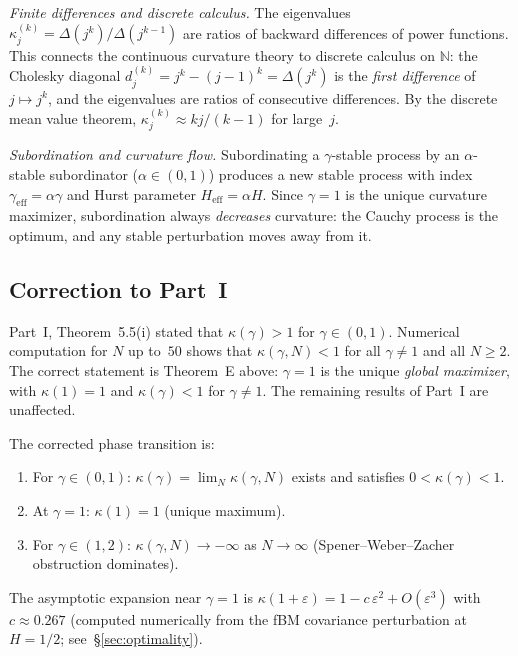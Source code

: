 \documentclass[11pt,a4paper]{article}
\theoremstyle{plain}
\theoremstyle{definition}
\theoremstyle{remark}
\newcommand{\N}{\mathbb{N}}
\begin{document}
\emph{Finite differences and discrete calculus.}
The eigenvalues $\kappa_j^{(k)} = \Delta(j^k)/\Delta(j^{k-1})$
are ratios of backward differences of power functions.
This connects the continuous curvature theory to
discrete calculus on $\N$: the Cholesky diagonal
$d_j^{(k)} = j^k - (j{-}1)^k = \Delta(j^k)$ is the
\emph{first difference} of $j \mapsto j^k$,
and the eigenvalues are ratios of consecutive differences.
By the discrete mean value theorem,
$\kappa_j^{(k)} \approx kj/(k{-}1)$ for large~$j$.

\emph{Subordination and curvature flow.}
Subordinating a $\gamma$-stable process by an $\alpha$-stable
subordinator ($\alpha \in (0,1)$) produces a new stable process
with index $\gamma_{\mathrm{eff}} = \alpha\gamma$ and Hurst
parameter $H_{\mathrm{eff}} = \alpha H$.
Since $\gamma = 1$ is the unique curvature maximizer,
subordination always \emph{decreases} curvature:
the Cauchy process is the optimum, and any stable
perturbation moves away from it.


\subsection{Correction to Part~I}

Part~I, Theorem~5.5(i) stated that
$\kappa(\gamma) > 1$ for $\gamma \in (0,1)$.
Numerical computation for $N$ up to~$50$ shows that
$\kappa(\gamma,N) < 1$ for all $\gamma \neq 1$ and all
$N \geq 2$. The correct statement is Theorem~E above:
$\gamma = 1$ is the unique \emph{global maximizer}, with
$\kappa(1) = 1$ and $\kappa(\gamma) < 1$ for $\gamma \neq 1$.
The remaining results of Part~I are unaffected.

The corrected phase transition is:
\begin{enumerate}[label=(\roman*)]
\item For $\gamma \in (0,1)$:
  $\kappa(\gamma) = \lim_N \kappa(\gamma,N)$ exists and
  satisfies $0 < \kappa(\gamma) < 1$.
\item At $\gamma = 1$: $\kappa(1) = 1$ (unique maximum).
\item For $\gamma \in (1,2)$:
  $\kappa(\gamma,N) \to -\infty$ as $N \to \infty$
  (Spener--Weber--Zacher obstruction dominates).
\end{enumerate}
The asymptotic expansion near $\gamma = 1$ is
$\kappa(1+\varepsilon) = 1 - c\,\varepsilon^2 + O(\varepsilon^3)$
with $c \approx 0.267$ (computed numerically from the fBM
covariance perturbation at $H = 1/2$;
see~\S\ref{sec:optimality}).
\end{document}
